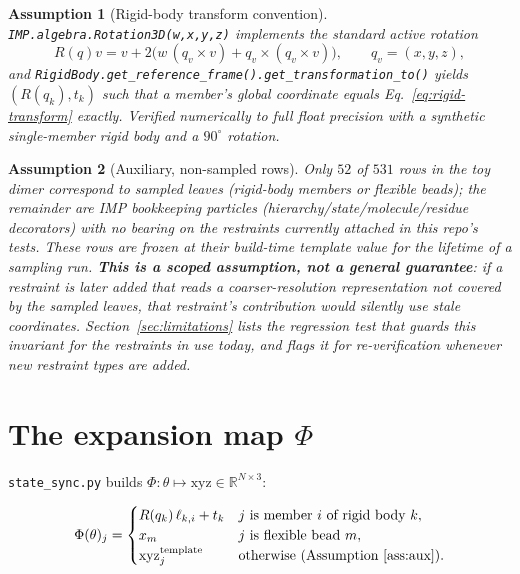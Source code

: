 \documentclass[11pt]{article}
\newtheorem{assumption}{Assumption}
\begin{document}
\begin{assumption}[Rigid-body transform convention]
\label{ass:quat}
\texttt{IMP.algebra.Rotation3D(w,x,y,z)} implements the standard active
rotation
\[
  R(q)v = v + 2\big(w\,(q_v \times v) + q_v \times (q_v \times v)\big), \qquad
  q_v = (x,y,z),
\]
and \texttt{RigidBody.get\_reference\_frame().get\_transformation\_to()}
yields $(R(q_k), t_k)$ such that a member's global coordinate equals
Eq.~\eqref{eq:rigid-transform} exactly. Verified numerically to full float
precision with a synthetic single-member rigid body and a $90^\circ$
rotation.
\end{assumption}

\begin{assumption}[Auxiliary, non-sampled rows]
\label{ass:aux}
Only $52$ of $531$ rows in the toy dimer correspond to sampled leaves
(rigid-body members or flexible beads); the remainder are IMP bookkeeping
particles (hierarchy/state/molecule/residue decorators) with no bearing on
the restraints currently attached in this repo's tests. These rows are
frozen at their build-time template value for the lifetime of a sampling
run. \textbf{This is a scoped assumption, not a general guarantee}: if a
restraint is later added that reads a coarser-resolution representation not
covered by the sampled leaves, that restraint's contribution would silently
use stale coordinates. Section~\ref{sec:limitations} lists the regression
test that guards this invariant for the restraints in use today, and flags
it for re-verification whenever new restraint types are added.
\end{assumption}

\section{The expansion map $\Phi$}
\label{sec:expansion}

\texttt{state\_sync.py} builds $\Phi: \theta \mapsto \mathrm{xyz} \in \mathbb{R}^{N\times 3}$:

\begin{equation}
  \label{eq:expansion}
  \Phi(\theta)_j =
  \begin{cases}
    R(q_k)\,\ell_{k,i} + t_k & j \text{ is member } i \text{ of rigid body } k, \\
    x_m & j \text{ is flexible bead } m, \\
    \mathrm{xyz}^{\text{template}}_j & \text{otherwise (Assumption~\ref{ass:aux})}.
  \end{cases}
\end{equation}
\end{document}
